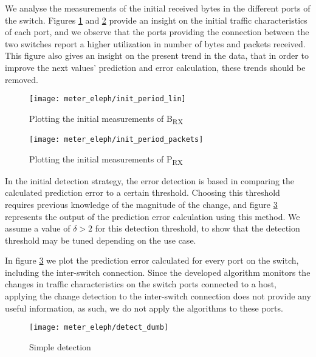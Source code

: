 \par We analyse the measurements of the initial received bytes in the different ports of the switch. Figures \ref{fig:init_plot} and \ref{fig:init_plot_pkts} provide
an insight on the initial traffic characteristics of each port, and we observe that the ports providing the connection between the two switches report a higher
utilization in number of bytes and packets received. This figure also gives an insight on the present trend in the data, that in order to improve the next
values' prediction and error calculation, these trends should be removed.

\begin{figure}[H]
    \centering
    \texttt{[image: meter\_eleph/init\_period\_lin]}
    \caption {Plotting the initial measurements of B\textsubscript{RX}}
    \label{fig:init_plot}
\end{figure} 

\begin{figure}[H]
    \centering
    \texttt{[image: meter\_eleph/init\_period\_packets]}
    \caption {Plotting the initial measurements of P\textsubscript{RX}}
    \label{fig:init_plot_pkts}
\end{figure} 

\par In the initial detection strategy, the error detection is based in comparing the calculated prediction error to a certain threshold. Choosing this threshold 
requires previous knowledge of the magnitude of the change, and figure \ref{fig:detect_dumb} represents the output of the prediction error calculation using this
method. We assume a value of $\delta > 2$ for this detection threshold, to show that the detection threshold may be tuned depending on the use case.

\par In figure \ref{fig:detect_dumb} we plot the prediction error calculated for every port on the switch, including the inter-switch connection. Since the developed
algorithm monitors the changes in traffic characteristics on the switch ports connected to a host, applying the change detection to the inter-switch connection
does not provide any useful information, as such, we do not apply the algorithms to these ports.

\begin{figure}[H]
    \centering
    \texttt{[image: meter\_eleph/detect\_dumb]}
    \caption {Simple detection}
    \label{fig:detect_dumb}
\end{figure} 

